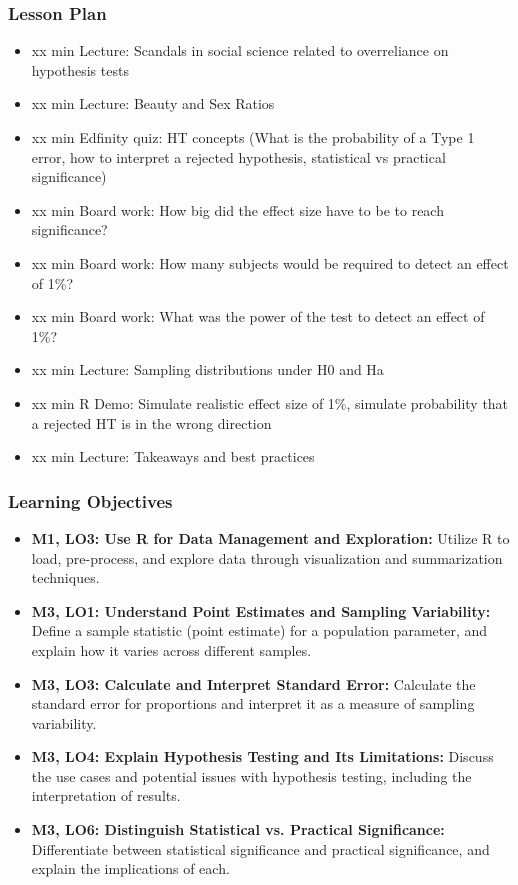 \begin{frame}
    \frametitle{Lesson Plan}
    \begin{itemize}
        \item xx min Lecture: Scandals in social science related to overreliance on hypothesis tests
        \item xx min Lecture: Beauty and Sex Ratios
        \item xx min Edfinity quiz: HT concepts (What is the probability of a Type 1 error, how to interpret a rejected hypothesis, statistical vs practical significance)
        \item xx min Board work: How big did the effect size have to be to reach significance?
        \item xx min Board work: How many subjects would be required to detect an effect of 1\%? 
        \item xx min Board work: What was the power of the test to detect an effect of 1\%?
        \item xx min Lecture: Sampling distributions under H0 and Ha
        \item xx min R Demo: Simulate realistic effect size of 1\%, simulate probability that a rejected HT is in the wrong direction
        \item xx min Lecture: Takeaways and best practices
    \end{itemize}
\end{frame}

\begin{frame}
    \frametitle{Learning Objectives}
    \begin{itemize}
        \item \textbf{M1, LO3: Use R for Data Management and Exploration:} Utilize R to load, pre-process, and explore data through visualization and summarization techniques.
        \item \textbf{M3, LO1: Understand Point Estimates and Sampling Variability:} Define a sample statistic (point estimate) for a population parameter, and explain how it varies across different samples.
        \item \textbf{M3, LO3: Calculate and Interpret Standard Error:} Calculate the standard error for proportions and interpret it as a measure of sampling variability.
        \item \textbf{M3, LO4: Explain Hypothesis Testing and Its Limitations:} Discuss the use cases and potential issues with hypothesis testing, including the interpretation of results.
        \item \textbf{M3, LO6: Distinguish Statistical vs. Practical Significance:} Differentiate between statistical significance and practical significance, and explain the implications of each.
    \end{itemize}
\end{frame}
    
